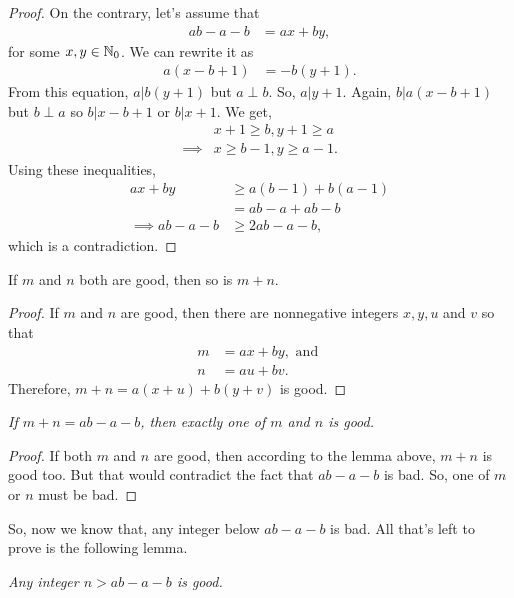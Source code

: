 \documentclass{subfile}
\begin{document}
	\begin{proof}
		On the contrary, let's assume that
			\begin{align*}
				ab-a-b & = ax+by,
			\end{align*}
		for some $x,y\in\mathbb{N}_0$. We can rewrite it as
			\begin{align*}
				a(x-b+1) & = -b(y+1).
			\end{align*}
		From this equation, $a|b(y+1)$ but $a\perp b$. So, $a|y+1$. Again, $b|a(x-b+1)$ but $b\perp a$ so $b|x-b+1$ or $b|x+1$. We get,
			\begin{align*}
				&  x+1\geq b, y+1\geq a\\
				\implies & x\geq b-1, y \geq a-1.
			\end{align*}
		Using these inequalities,
			\begin{align*}
				 ax+by & \geq a(b-1)+b(a-1) \\
				&= ab-a+ab-b\\
				\implies   ab-a-b & \geq 2ab-a-b,
			\end{align*}
		which is a contradiction.
	\end{proof}
	
	\begin{lemma}
		If $m$ and $n$ both are good, then so is $m+n$.
	\end{lemma}
	
	\begin{proof}
		If $m$ and $n$ are good, then there are nonnegative integers $x,y,u$ and $v$ so that
			\begin{align*}
				m & = ax+by, \text{ and }\\
				n & = au+bv.
			\end{align*}
		Therefore, $m+n= a(x+u)+b(y+v)$ is good.
	\end{proof}
	
	\begin{lemma}\slshape
		If $m+n=ab-a-b$, then exactly one of $m$ and $n$ is good.
	\end{lemma}
	
	\begin{proof}
		If both $m$ and $n$ are good, then according to the lemma above, $m+n$ is good too. But that would contradict the fact that $ab-a-b$ is bad. So, one of $m$ or $n$ must be bad.
	\end{proof}
So, now we know that, any integer below $ab-a-b$ is bad. All that's left to prove is the following lemma.
	\begin{lemma}\slshape
		Any integer $n>ab-a-b$ is good.
	\end{lemma}
	
\end{document}
